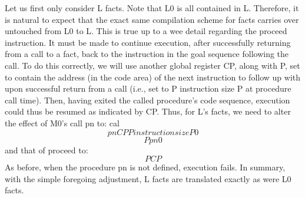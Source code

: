 
Let us first only consider L facts. Note that L0 is all contained in L.
Therefore, it is natural to expect that the exact same compilation scheme for
facts carries over untouched from L0 to L. This is true up to a wee detail
regarding the proceed instruction. It must be made to continue execution, after
successfully returning from a call to a fact, back to the instruction in the
goal sequence following the call. To do this correctly, we will use another
global register CP, along with P, set to contain the address (in the code area)
of the next instruction to follow up with upon successful return from a call
(i.e., set to P instruction size P at procedure call time). Then, having exited
the called procedure’s code sequence, execution could thus be resumed as
indicated by CP. Thus, for L’s facts, we need to alter the effect of M0’s call
pn to:
cal
\[pn  CP  P  instruction sizeP0\]
\[P  pn0\]
and that of proceed to:
\[P  CP\]
As before, when the procedure pn is not defined, execution fails.
In summary, with the simple foregoing adjustment, L facts are translated exactly
as were L0 facts.